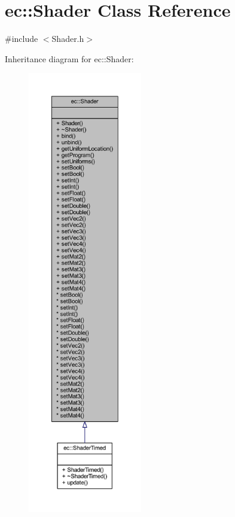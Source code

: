 \hypertarget{classec_1_1_shader}{}\section{ec\+:\+:Shader Class Reference}
\label{classec_1_1_shader}


{\ttfamily \#include $<$Shader.\+h$>$}



Inheritance diagram for ec\+:\+:Shader\+:\nopagebreak
\begin{figure}[H]
\begin{center}
\leavevmode
\includegraphics[height=550pt]{classec_1_1_shader__inherit__graph}
\end{center}
\end{figure}



